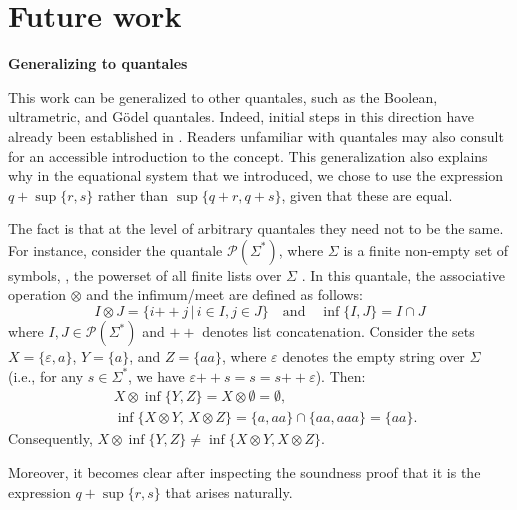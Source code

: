 \chapter{Future work}\label{ch:future_work}


\textbf{Generalizing to quantales}


This work can be generalized to other quantales, such as the Boolean, ultrametric, and Gödel quantales. Indeed, initial steps in this direction have already been established in \cite{bmql25}.   Readers unfamiliar with quantales may also consult \cite{STUBBE201495} for an accessible introduction to the concept.
This generalization also explains why in the equational system that we introduced, we chose to use the expression \( q + \sup\{r, s\} \) rather than \( \sup\{q + r, q + s\} \), given that these are equal.

The fact is that at the level of arbitrary quantales they need not to be the same. For instance, consider the quantale \(\mathcal{P}(\Sigma^*)\), where \(\Sigma\) is a finite non-empty set of symbols, \ie, the powerset of all finite lists over \(\Sigma\) \cite{STUBBE201495}. In this quantale, the associative operation \(\otimes\) and the infimum/meet are defined as follows:
\[ I \otimes J =  \{ i \mathbin{+\!+} j \,|\, i \in I, j \in J \} \quad \text{and} \quad \inf \{ I, J\} = I \cap  J  \]
where \(I, J \in \mathcal{P}(\Sigma^*)\) and \(\mathbin{+\!+}\) denotes list concatenation.
Consider the sets $X = \{\varepsilon, a\}$, $Y = \{a\}$, and $Z = \{aa\}$, where $\varepsilon$ denotes the empty string over $\Sigma$ (i.e., for any $s \in \Sigma^*$, we have $\varepsilon \mathbin{+\!+} s = s = s \mathbin{+\!+} \varepsilon$). Then:
\begin{align*}
  & X \otimes \inf\{Y, Z\} = X \otimes \emptyset = \emptyset, \\
  &\inf\{X \otimes Y,\, X \otimes Z\} =  \{a, aa\} \cap \{aa, aaa\} = \{aa\}.
\end{align*}
Consequently, $X \otimes \inf\{Y,Z\} \neq  \inf\{X \otimes Y, X \otimes Z \}.$

Moreover, it becomes clear after inspecting the soundness proof that it is the expression \( q + \sup\{r, s\} \) that arises naturally. 


